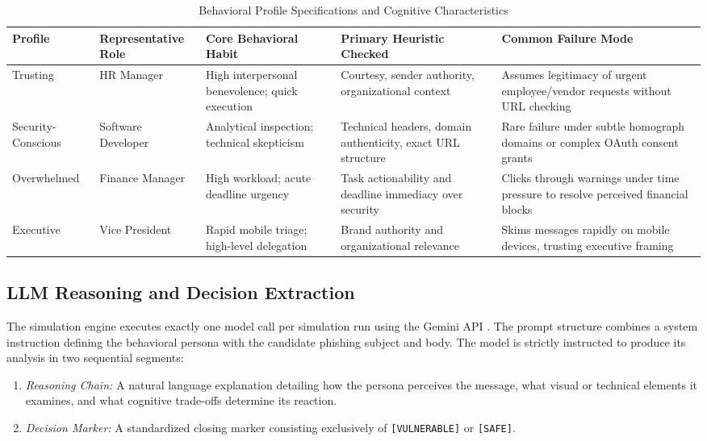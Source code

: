 \documentclass[conference,letterpaper]{IEEEtran}
\begin{document}
\begin{table}[t]
\caption{Behavioral Profile Specifications and Cognitive Characteristics}
\label{tab:comparison_profiles}
\centering
\renewcommand{\arraystretch}{0.90}
\begin{tabularx}{\textwidth}{lp{2.5cm}Xp{3.5cm}X}
\toprule
\textbf{Profile} & \textbf{Representative Role} & \textbf{Core Behavioral Habit} & \textbf{Primary Heuristic Checked} & \textbf{Common Failure Mode} \\
\midrule
Trusting & HR Manager & High interpersonal benevolence; quick execution & Courtesy, sender authority, organizational context & Assumes legitimacy of urgent employee/vendor requests without URL checking \\
\addlinespace
Security-Conscious & Software Developer & Analytical inspection; technical skepticism & Technical headers, domain authenticity, exact URL structure & Rare failure under subtle homograph domains or complex OAuth consent grants \\
\addlinespace
Overwhelmed & Finance Manager & High workload; acute deadline urgency & Task actionability and deadline immediacy over security & Clicks through warnings under time pressure to resolve perceived financial blocks \\
\addlinespace
Executive & Vice President & Rapid mobile triage; high-level delegation & Brand authority and organizational relevance & Skims messages rapidly on mobile devices, trusting executive framing \\
\bottomrule
\end{tabularx}
\end{table}

\subsection{LLM Reasoning and Decision Extraction}
The simulation engine executes exactly one model call per simulation run using the Gemini API \cite{gemini2024}. The prompt structure combines a system instruction defining the behavioral persona with the candidate phishing subject and body. The model is strictly instructed to produce its analysis in two sequential segments:
\begin{enumerate}
    \item \textit{Reasoning Chain:} A natural language explanation detailing how the persona perceives the message, what visual or technical elements it examines, and what cognitive trade-offs determine its reaction.
    \item \textit{Decision Marker:} A standardized closing marker consisting exclusively of \texttt{[VULNERABLE]} or \texttt{[SAFE]}.
\end{enumerate}
\end{document}
